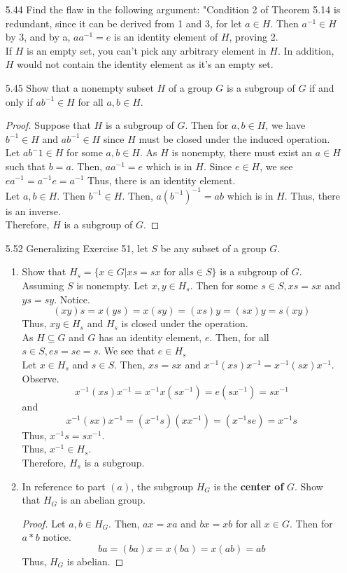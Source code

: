 \documentclass[12pt]{article}
\begin{document}
\begin{enumerate}
\begin{proof}
			Therefore,$ \phi[H]$ is a subgroup of $ G' $ 
		\end{proof}
		\item[5.44] Find the flaw in the following argument: "Condition 2 of Theorem 5.14 is redundant, since it can be derived from 1 and 3, for let $a \in H$. Then $a^{-1}\in H$ by 3, and by a, $aa^{-1} = e$ is an identity element of $H$, proving 2.\\
		If $ H $ is an empty set, you can't pick any arbitrary element in $ H $. In addition, $ H $ would not contain the identity element as it's an empty set.
		\item[5.45] Show that a nonempty subset $H$ of a group $G$ is a subgroup of $G$ if and only if $ab^{-1}\in H$ for all $a,b \in H$.
			\begin{proof}
				Suppose that $ H $ is a subgroup of $ G $. Then for $ a,b\in H $, we have $ b^{-1}\in H $ and $ ab^{-1}\in H $ since $ H $ must be closed under the induced operation.\\
				Let $ ab^-1\in H $ for some $ a,b\in H $. As $ H $ is nonempty, there must exist an $ a\in H $ such that $ b=a $. Then, $ aa^{-1}=e $ which is in $ H $. Since $ e\in H $, we see $ ea^{-1}=a^{-1}e=a^{-1} $ Thus, there is an identity element.\\
				Let $ a,b\in H $. Then $ b^{-1}\in H $. Then, $ a(b^{-1})^{-1}=ab $ which is in $ H $. Thus, there is an inverse.\\
				Therefore, $ H $ is a subgroup of $ G $.
				
			\end{proof}
		\item[5.52] Generalizing Exercise 51, let $S$ be any subset of a group $G$.
		
		\begin{enumerate}
			\item Show that $H_s = \{x \in G|xs = sx \text{ for all} s \in S\}$ is a subgroup of $G$. Assuming $ S $ is nonempty. Let $ x,y\in H_s $. Then for some $ s\in S , xs =sx$ and $ ys=sy $. Notice. 
			\[(xy)s=x(ys)=x(sy)=(xs)y=(sx)y=s(xy)\]
			Thus, $ xy\in H_s $ and $ H_s $ is closed under the operation.\\
			As $ H \subseteq G$ and $ G $ has an identity element, $e $. Then, for all $s\in S, es=se=s $. We see that $ e\in H_s $\\
			Let $ x\in H_s $ and $ s\in S $. Then, $ xs=sx $ and $ x^{-1}(xs)x^{-1}=x^{-1}(sx)x^{-1} $. Observe.
			\[x^{-1}(xs)x^{-1}=x^{-1}x(sx^{-1})=e(sx^{-1})=sx^{-1}\]
			and
			\[x^{-1}(sx)x^{-1}=(x^{-1}s)(xx^{-1})=(x^{-1}se)=x^{-1}s\]
			Thus, $ x^{-1}s=sx^{-1} $.\\
			Thus, $ x^{-1}\in H_s $.\\
			Therefore, $ H_s $ is a subgroup.
			\item In reference to part $(a)$, the subgroup $H_G$ is the \textbf{center of} $G$. Show that $H_G$ is an abelian group.
			\begin{proof}
				Let $ a,b\in H_G $. Then, $ ax=xa $ and $ bx=xb $ for all $ x \in G $. Then for $ a*b $ notice.
				\[ba=(ba)x=x(ba)=x(ab)=ab\]
				Thus, $ H_G $ is abelian.
			\end{proof}
		\end{enumerate}
		

\end{enumerate}
\end{document}
